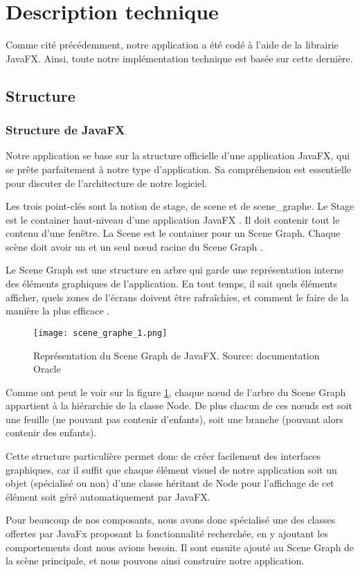 \section{Description technique}

Comme cité précédemment, notre application a été codé à l'aide de la librairie JavaFX. Ainsi, toute notre implémentation technique est basée sur cette dernière.

\subsection{Structure}
\subsubsection{Structure de JavaFX}
Notre application se base sur la structure officielle d'une application JavaFX, qui se prête parfaitement à notre type d'application. Sa compréhension est essentielle pour discuter de l'architecture de notre logiciel.
\par
Les trois point-clés sont la notion de \gls{stage}, de \gls{scene} et de \gls{scene_graphe}. Le Stage est le container haut-niveau d'une application JavaFX \cite{javadoc_stage}. Il doit contenir tout le contenu d'une fenêtre. La Scene est le container pour un Scene Graph. Chaque scène doit avoir un et un seul n\oe ud racine du Scene Graph \cite{javadoc_scene}.
\par
Le Scene Graph est une structure en arbre qui garde une représentation interne des éléments graphiques de l'application. En tout temps, il sait quels éléments afficher, quels zones de l'écrans doivent être rafraîchies, et comment le faire de la manière la plus efficace \cite{javadoc_scene_graphe}. 	

\begin{figure}[H]
	\caption{Représentation du Scene Graph de JavaFX. Source: documentation Oracle \cite{javadoc_scene_graphe}}
	\centering
	\texttt{[image: scene\_graphe\_1.png]}
	\label{fig:scene_graphe_1}
\end{figure}
Comme ont peut le voir sur la figure \ref{fig:scene_graphe_1}, chaque nœud de l'arbre du Scene Graph appartient à la hiérarchie de la classe Node. De plus chacun de ces nœuds est soit une feuille (ne pouvant pas contenir d'enfants), soit une branche (pouvant alors contenir des enfants).
\par
Cette structure particulière permet donc de créer facilement des interfaces graphiques, car il suffit que chaque élément visuel de notre application soit un objet (spécialisé ou non) d'une classe héritant de Node pour l'affichage de cet élément soit géré automatiquement par JavaFX.
\par
Pour beaucoup de nos composants, nous avons donc spécialisé une des classes offertes par JavaFx proposant la fonctionnalité recherchée, en y ajoutant les comportements dont nous avions besoin. Il sont ensuite ajouté au Scene Graph de la scène principale, et nous pouvons ainsi construire notre application.


